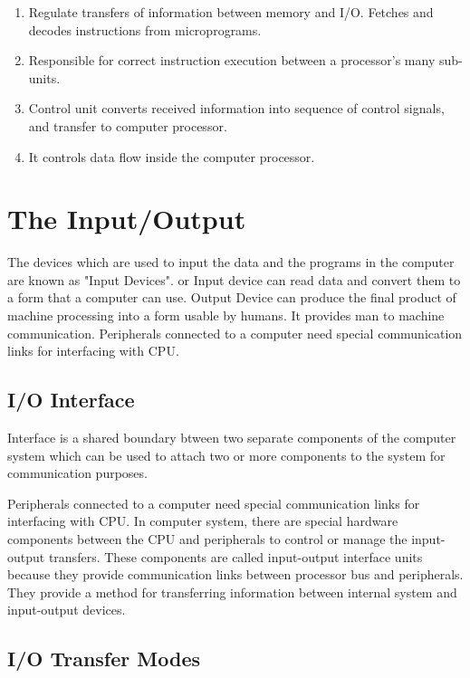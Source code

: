 \documentclass{article}
\begin{document}
\begin{enumerate}
\item Regulate transfers of information between memory and I/O.
 Fetches and decodes instructions from microprograms.

\item Responsible for correct instruction execution between a processor's many sub-units.

\item Control unit converts received information into sequence of control signals, and transfer to computer processor.

\item It controls data flow inside the computer processor.
\end{enumerate}

\newpage
\section{The Input/Output}
The devices which are used to input the data and the programs in the computer are known as "Input Devices". or  Input device can read data and convert them to a form that a computer can use. Output Device can produce the final product of machine processing into a form usable by humans. It provides man to machine communication. Peripherals connected to a computer need special communication links for interfacing with CPU.  	

\subsection{I/O Interface}
Interface is a shared boundary btween two separate components of the computer system which can be used to attach two or more components to the system for communication purposes. \par

Peripherals connected to a computer need special communication links for interfacing with CPU. In computer system, there are special hardware components between the CPU and peripherals to control or manage the input-output transfers. These components are called input-output interface units because they provide communication links between processor bus and peripherals. They provide a method for transferring information between internal system and input-output devices.

\subsection{I/O Transfer Modes}
\end{document}
